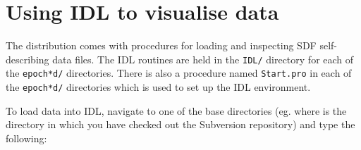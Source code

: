 \section{Using IDL to visualise data}
\label{sec:idl}

  The {\EPOCH} distribution comes with procedures for loading and inspecting
  SDF self-describing data files.
  The IDL routines are held in the {\tt IDL/} directory
  for each of the {\tt epoch*d/} directories. There is also a procedure
  named {\tt Start.pro} in each of the {\tt epoch*d/} directories which is
  used to set up the IDL environment.

  To load data into IDL, navigate to one of the base directories (eg.
   where  is the directory in which you
  have checked out the Subversion repository) and type
  the following:


